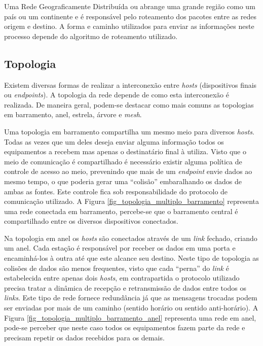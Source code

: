 Uma Rede Geograficamente Distribuída ou  abrange uma grande região como um país ou um continente e é responsável pelo roteamento dos pacotes entre as redes origem e destino. A forma e caminho utilizados para enviar as informações neste processo depende do algoritmo de roteamento utilizado. \cite{Book-Tanenbaum2003}

\subsection{Topologia}
Existem diversas formas de realizar a interconexão entre \emph{hosts} (dispositivos finais ou \emph{endpoints}). A topologia da rede depende de como esta interconexão é realizada. De maneira geral, podem-se destacar como mais comuns as topologias em barramento, anel, estrela, árvore e \emph{mesh}.

Uma topologia em barramento compartilha um mesmo meio para diversos \emph{hosts}. Todas as vezes que um deles deseja enviar alguma informação todos os equipamentos a recebem mas apenas o destinatário final à utiliza. Visto que o meio de comunicação é compartilhado é necessário existir alguma política de controle de acesso ao meio, prevenindo que mais de um \emph{endpoint} envie dados ao mesmo tempo, o que poderia gerar uma ``colisão'' embaralhando os dados de ambas as fontes. Este controle fica sob responsabilidade do protocolo de comunicação utilizado. A Figura \ref{fig_topologia_multiplo_barramento} representa uma rede conectada em barramento, percebe-se que o barramento central é compartilhado entre os diversos dispositivos conectados.


Na topologia em anel os \emph{hosts} são conectados através de um \emph{link} fechado, criando um anel. Cada estação é responsável por receber os dados em uma porta e encaminhá-los à outra até que este alcance seu destino. Neste tipo de topologia as colisões de dados são menos frequentes, visto que cada ``perna'' do \emph{link} é estabelecida entre apenas dois \emph{hosts}, em contrapartida o protocolo utilizado precisa tratar a dinâmica de recepção e retransmissão de dados entre todos os \emph{links}. Este tipo de rede fornece redundância já que as mensagens trocadas podem ser enviadas por mais de um caminho (sentido horário ou sentido anti-horário). A Figura \ref{fig_topologia_multiplo_barramento_anel} representa uma rede em anel, pode-se perceber que neste caso todos os equipamentos fazem parte da rede e precisam repetir os dados recebidos para os demais.


